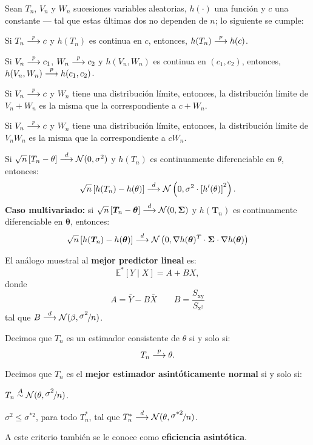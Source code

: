 \documentclass[8pt,a4paper]{extarticle}
\begin{document}
\begin{multicols}{3}
	\begin{boxtheo}[de Slutsky]
		Sean $T_n$, $V_n$ y $W_n$ sucesiones variables aleatorias, $h(\cdot)$ una función y $c$ una constante --- tal que estas últimas dos no dependen de $n$; lo siguiente se cumple:
		\begin{eqlist}
			\item Si $T_n \overset{p}{\longrightarrow} c$ y $h(T_n)$ es continua en $c$, entonces, $h(T_n) \overset{p}{\longrightarrow} h(c)$.
			\item Si $V_n \overset{p}{\longrightarrow} c_1$, $W_n \overset{p}{\longrightarrow} c_2$ y $h(V_n,W_n)$ es continua en $(c_1,c_2)$, entonces, $h(V_n,W_n) \overset{p}{\longrightarrow} h(c_1,c_2)$.
			\item Si $V_n \overset{p}{\longrightarrow} c$ y $W_n$ tiene una distribución límite, entonces, la distribución límite de $V_n + W_n$ es la misma que la correspondiente a $c + W_n$.
			\item Si $V_n \overset{p}{\longrightarrow} c$ y $W_n$ tiene una distribución límite, entonces, la distribución límite de $V_n W_n$ es la misma que la correspondiente a $c W_n$.
			\item Si $\sqrt{n}\left[ T_n - \theta \right] \overset{d}{\longrightarrow} \mathcal{N}(0, \sigma^2)$ y $h(T_n)$ es continuamente diferenciable en $\theta$, entonces: \[\sqrt{n} \left[ h(T_n) - h(\theta) \right] \overset{d}{\longrightarrow} \mathcal{N}\left(0, \sigma^2 \cdot \left[ h'(\theta) \right]^2 \right).\] \textbf{Caso multivariado:} si $\sqrt{n} \left[ {\bm T_n} - {\bm\theta} \right] \overset{d}{\longrightarrow} \mathcal{N}(0, {\bm \Sigma})$ y $h({\bm T_n})$ es continuamente diferenciable en ${\bm\theta}$, entonces: \[\sqrt{n} \left[ h({\bm T_n}) - h({\bm\theta}) \right] \overset{d}{\longrightarrow} \mathcal{N}\left(0, \nabla h({\bm\theta})^T \cdot {\bm \Sigma} \cdot \nabla h({\bm\theta}) \right)\]
		\end{eqlist}
	\end{boxtheo}

	\begin{boxprop}
		El análogo muestral al \textbf{mejor predictor lineal} es:
		\[
			\mathbb{E}^*\left[ Y  \mid X \right] = A + B X
			,\]
		donde
		\[
			A = \bar{Y} - B \bar{X} \qquad B = \frac{ S_{\mathrm{xy}} }{ S_{\mathrm{x}^2} }
		\]
		tal que $B \overset{d}{\longrightarrow} \mathcal{N}(\beta, \nicefrac{\displaystyle \sigma^2}{\displaystyle n})$.
	\end{boxprop}

	\begin{boxdef}[Consistencia]
		Decimos que $T_n$ es un estimador consistente de $\theta$ si y solo si:
		\[T_n \overset{p}{\longrightarrow} \theta.\]
	\end{boxdef}

	\begin{boxdef}
		Decimos que $T_n$ es el \textbf{mejor estimador asintóticamente normal} si y solo si:
		\begin{eqlist}
			\item $T_n \overset{A}{\sim} \mathcal{N}(\theta,\nicefrac{\displaystyle \sigma^2}{\displaystyle n})$.
			\item $\sigma^2 \leq \sigma^{*2}$, para todo $T^*_n$, tal que $T^*_n \overset{d}{\longrightarrow} \mathcal{N}(\theta,\nicefrac{\displaystyle \sigma^{*2}}{\displaystyle n})$.
		\end{eqlist}
		A este criterio también se le conoce como \textbf{eficiencia asintótica}.
	\end{boxdef}


\end{multicols}
\end{document}

